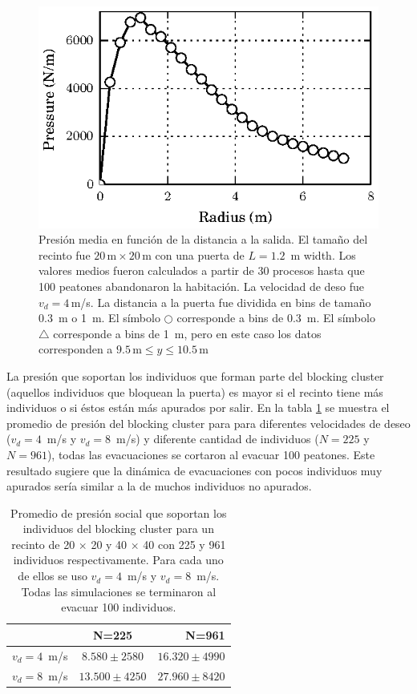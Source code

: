 \begin{figure}[H]
    \centering
    \includegraphics[scale=0.8]{figuras/p_dist.eps}
    \caption[width=5cm]{Presión media en función de la distancia a la salida. El tamaño del recinto fue $20\,\mathrm{m}\times20\,\mathrm{m}$  con una puerta de $L=1.2$~m width. Los valores medios fueron calculados a partir de 30 procesos hasta que 100 peatones abandonaron la habitación. La velocidad de deso fue $v_d=4\,$m/s. La distancia a la puerta fue dividida en bins de tamaño $0.3$~m o 1~m.  El símbolo $\bigcirc$  corresponde a bins de $0.3$~m. El símbolo $\bigtriangleup$ corresponde a bins de 1~m, pero en este caso los datos corresponden a  $9.5\,\mathrm{m}\leq y\leq 10.5\,\mathrm{m}$ }
    \label{fis_g}
\end{figure}

La presión que soportan los individuos que forman parte del blocking cluster (aquellos individuos que bloquean la puerta) es mayor si el recinto tiene más individuos o si éstos están más apurados por salir. En la tabla \ref{tabla_p}  se muestra el promedio de presión del blocking cluster para para diferentes velocidades de deseo ($v_d=4$~m/s y $v_d=8$~m/s) y diferente cantidad de individuos ($N=225$ y $N=961$), todas las evacuaciones se cortaron al evacuar 100 peatones. Este resultado sugiere que la dinámica de evacuaciones con pocos individuos muy apurados sería similar a la de muchos individuos no apurados.

\begin{table}[H]
\begin{center}
   \begin{tabular}{| l | c | r | }
     \hline
      & N=225 & N=961 \\ \hline
     $v_d = 4$~m/s & $8.580 \pm 2580$   & $16.320 \pm 4990$ \\ \hline
     $v_d = 8$~m/s & $13.500 \pm 4250$  & $27.960 \pm 8420$  \\
     \hline
   \end{tabular}
 \end{center}
   \caption[width=5cm]{Promedio de presión social que soportan los individuos del blocking cluster para un recinto de 20 $\times$ 20 y 40 $\times$ 40 con 225 y 961 individuos respectivamente. Para cada uno de ellos se uso $v_d=4$~m/s y $v_d=8$~m/s. Todas las simulaciones se terminaron al evacuar 100 individuos.}
   \label{tabla_p}
   \end{table}   
   

